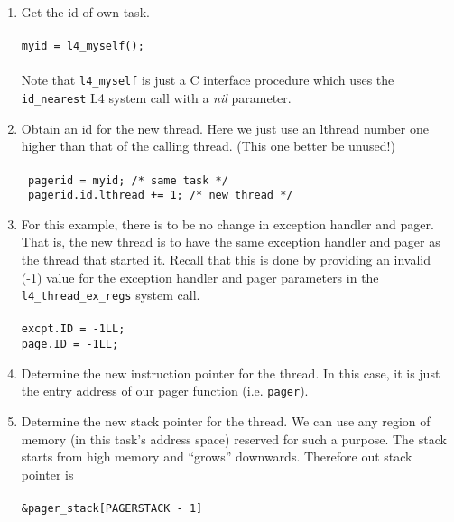 \begin{enumerate}

\item Get the id of own task. \\ \\
  \hspace*{10pt} {\footnotesize\verb+myid = l4_myself();+} \\ \\
  Note that {\footnotesize\verb+l4_myself+} is just a C interface procedure which
  uses the {\footnotesize\verb+id_nearest+} L4 system call with a \emph{nil} parameter.
  
\item Obtain an id for the new thread. Here we just use an
  lthread number one higher than that of the calling thread. (This
  one better be unused!) \\ \\
  \hspace*{10pt} {\footnotesize\verb+ pagerid = myid; /* same task */+} \\
  \hspace*{10pt} {\footnotesize\verb" pagerid.id.lthread += 1; /* new thread */"}

\item For this example, there is to be no change in exception handler
  and pager. That is, the new thread is to have the same exception
  handler and pager as the thread that started it. Recall that this
  is done by providing an invalid (-1) value for the exception handler
  and pager parameters in the {\footnotesize\verb+l4_thread_ex_regs+} system call. \\ \\
  \hspace*{10pt} {\footnotesize\verb+excpt.ID = -1LL;+} \\
  \hspace*{10pt} {\footnotesize\verb+page.ID = -1LL;+}
  
\item Determine the new instruction pointer for the thread. In this
  case, it is just the entry address of our pager function (i.e.
  {\footnotesize\verb+pager+}).

\item Determine the new stack pointer for the thread. We can use any
  region of memory (in this task's address space) reserved for such a
  purpose. The stack starts from high memory and ``grows'' downwards.
  Therefore out stack pointer is\\ \\
  \hspace*{10pt} {\footnotesize\verb+&pager_stack[PAGERSTACK - 1]+}
  

\end{enumerate}
